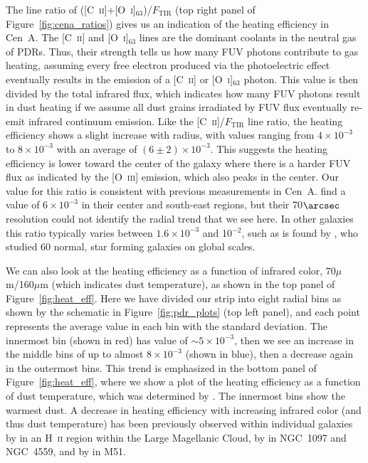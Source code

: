 \documentclass[preprint2]{aastex}
\begin{document}
The line ratio of ([C~\textsc{ii}]+[O~\textsc{i}]$_{63}$)/$F_{\mathrm{TIR}}$ (top right panel of Figure~\ref{fig:cena_ratios}) gives us an indication of the heating efficiency in Cen~A.  The [C~\textsc{ii}] and [O~\textsc{i}]$_{63}$ lines are the dominant coolants in the neutral gas of PDRs.  Thus, their strength tells us how many FUV photons contribute to gas heating, assuming every free electron produced via the photoelectric effect eventually results in the emission of a [C~\textsc{ii}] or [O~\textsc{i}]$_{63}$ photon.  This value is then divided by the total infrared flux, which indicates how many FUV photons result in dust heating if we assume all dust grains irradiated by FUV flux eventually re-emit infrared continuum emission.  Like the [C~\textsc{ii}]/$F_{\mathrm{TIR}}$ line ratio, the heating efficiency shows a slight increase with radius, with values ranging from $4 \times 10^{-3}$ to $8 \times 10^{-3}$ with an average of $(6 \pm 2) \times 10^{-3}$.  This suggests the heating efficiency is lower toward the center of the galaxy where there is a harder FUV flux as indicated by the [O~\textsc{iii}] emission, which also peaks in the center.  Our value for this ratio is consistent with previous measurements in Cen~A. \citet{2000A&A...355..885U} find a value of $6 \times 10^{-3}$ in their center and south-east regions, but their 70$\arcsec$ resolution could not identify the radial trend that we see here.  In other galaxies this ratio typically varies between $1.6 \times 10^{-3}$ and 10$^{-2}$, such as is found by \citet{2001ApJ...561..766M}, who studied 60 normal, star forming galaxies on global scales.

We can also look at the heating efficiency as a function of infrared color, 70$\mu$m/160$\mu$m (which indicates dust temperature), as shown in the top panel of Figure~\ref{fig:heat_eff}.  Here we have divided our strip into eight radial bins as shown by the schematic in Figure~\ref{fig:pdr_plots} (top left panel), and each point represents the average value in each bin with the standard deviation.  The innermost bin (shown in red) has value of $\sim 5 \times 10^{-3}$, then we see an increase in the middle bins of up to almost $8 \times 10^{-3}$ (shown in blue), then a decrease again in the outermost bins.  This trend is emphasized in the bottom panel of Figure~\ref{fig:heat_eff}, where we show a plot of the heating efficiency as a function of dust temperature, which was determined by \citet{2012MNRAS.422.2291P}.  The innermost bins show the warmest dust.  A decrease in heating efficiency with increasing infrared color (and thus dust temperature) has been previously observed within individual galaxies by \citet{2012A&A...548A..91L} in an H~\textsc{ii} region within the Large Magellanic Cloud, by \citet{2012ApJ...747...81C} in NGC~1097 and NGC~4559, and by \citet{parkin_2013} in M51.
\end{document}
